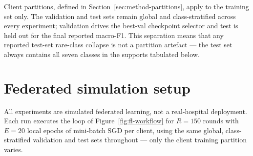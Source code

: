 \documentclass[11pt,a4paper]{report}
\begin{document}
Client partitions, defined in Section~\ref{sec:method-partitions}, apply
to the training set only. The validation and test sets remain global and
class-stratified across every experiment; validation drives the best-val
checkpoint selector and test is held out for the final reported macro-F1.
This separation means that any reported test-set rare-class collapse is
not a partition artefact --- the test set always contains all seven
classes in the supports tabulated below.

\begin{table}[H]
\centering
\small
\caption{DermaMNIST class supports and roles in this thesis. Train
prevalence and test support are computed directly from the MedMNIST~v2
release; the train support totals $7007$ and the test support totals
$2005$. The rare-class group $\mathrm{RARE\_IDX} = \{\text{dermato},
\text{melanoma}, \text{vascular}\}$ defines the rare-class F1 used
throughout Chapter~\ref{ch:results}.}
\label{tab:dataset-classes}
\end{table}

\section{Federated simulation setup}
\label{sec:method-simulation}

All experiments are simulated federated learning, not a real-hospital
deployment. Each run executes the loop of Figure~\ref{fig:fl-workflow} for
$R = 150$ rounds with $E = 20$ local epochs of mini-batch SGD per client, using
the same global, class-stratified validation and test sets throughout --- only
the client training partition varies.
\end{document}
